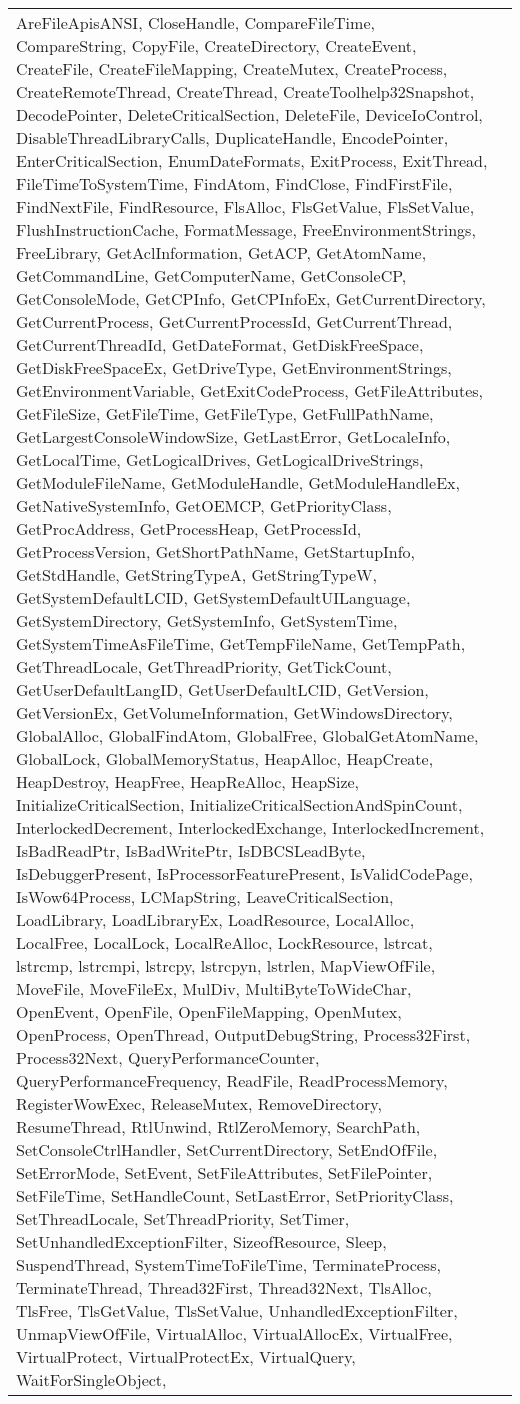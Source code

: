 \begin{longtable}[H]{ | m{3.5cm} | m{10cm} | }
AreFileApisANSI, CloseHandle, CompareFileTime, CompareString, CopyFile, CreateDirectory, CreateEvent, CreateFile, CreateFileMapping, CreateMutex, CreateProcess, CreateRemoteThread, CreateThread, CreateToolhelp32Snapshot, DecodePointer, DeleteCriticalSection, DeleteFile, DeviceIoControl, DisableThreadLibraryCalls, DuplicateHandle, EncodePointer, EnterCriticalSection, EnumDateFormats, ExitProcess, ExitThread, FileTimeToSystemTime, FindAtom, FindClose, FindFirstFile, FindNextFile, FindResource, FlsAlloc, FlsGetValue, FlsSetValue, FlushInstructionCache, FormatMessage, FreeEnvironmentStrings, FreeLibrary, GetAclInformation, GetACP, GetAtomName, GetCommandLine, GetComputerName, GetConsoleCP, GetConsoleMode, GetCPInfo, GetCPInfoEx, GetCurrentDirectory, GetCurrentProcess, GetCurrentProcessId, GetCurrentThread, GetCurrentThreadId, GetDateFormat, GetDiskFreeSpace, GetDiskFreeSpaceEx, GetDriveType, GetEnvironmentStrings, GetEnvironmentVariable, GetExitCodeProcess, GetFileAttributes, GetFileSize, GetFileTime, GetFileType, GetFullPathName, GetLargestConsoleWindowSize, GetLastError, GetLocaleInfo, GetLocalTime, GetLogicalDrives, GetLogicalDriveStrings, GetModuleFileName, GetModuleHandle, GetModuleHandleEx, GetNativeSystemInfo, GetOEMCP, GetPriorityClass, GetProcAddress, GetProcessHeap, GetProcessId, GetProcessVersion, GetShortPathName, GetStartupInfo, GetStdHandle, GetStringTypeA, GetStringTypeW, GetSystemDefaultLCID, GetSystemDefaultUILanguage, GetSystemDirectory, GetSystemInfo, GetSystemTime, GetSystemTimeAsFileTime, GetTempFileName, GetTempPath, GetThreadLocale, GetThreadPriority, GetTickCount, GetUserDefaultLangID, GetUserDefaultLCID, GetVersion, GetVersionEx, GetVolumeInformation, GetWindowsDirectory, GlobalAlloc, GlobalFindAtom, GlobalFree, GlobalGetAtomName, GlobalLock, GlobalMemoryStatus, HeapAlloc, HeapCreate, HeapDestroy, HeapFree, HeapReAlloc, HeapSize, InitializeCriticalSection, InitializeCriticalSectionAndSpinCount, InterlockedDecrement, InterlockedExchange, InterlockedIncrement, IsBadReadPtr, IsBadWritePtr, IsDBCSLeadByte, IsDebuggerPresent, IsProcessorFeaturePresent, IsValidCodePage, IsWow64Process, LCMapString, LeaveCriticalSection, LoadLibrary, LoadLibraryEx, LoadResource, LocalAlloc, LocalFree, LocalLock, LocalReAlloc, LockResource, lstrcat, lstrcmp, lstrcmpi, lstrcpy, lstrcpyn, lstrlen, MapViewOfFile, MoveFile, MoveFileEx, MulDiv, MultiByteToWideChar, OpenEvent, OpenFile, OpenFileMapping, OpenMutex, OpenProcess, OpenThread, OutputDebugString, Process32First, Process32Next, QueryPerformanceCounter, QueryPerformanceFrequency, ReadFile, ReadProcessMemory, RegisterWowExec, ReleaseMutex, RemoveDirectory, ResumeThread, RtlUnwind, RtlZeroMemory, SearchPath, SetConsoleCtrlHandler, SetCurrentDirectory, SetEndOfFile, SetErrorMode, SetEvent, SetFileAttributes, SetFilePointer, SetFileTime, SetHandleCount, SetLastError, SetPriorityClass, SetThreadLocale, SetThreadPriority, SetTimer, SetUnhandledExceptionFilter, SizeofResource, Sleep, SuspendThread, SystemTimeToFileTime, TerminateProcess, TerminateThread, Thread32First, Thread32Next, TlsAlloc, TlsFree, TlsGetValue, TlsSetValue, UnhandledExceptionFilter, UnmapViewOfFile, VirtualAlloc, VirtualAllocEx, VirtualFree, VirtualProtect, VirtualProtectEx, VirtualQuery, WaitForSingleObject, 
\end{longtable}
